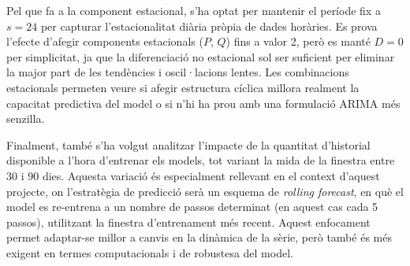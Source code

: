 \documentclass[../main.tex]{subfiles}
\begin{document}
Pel que fa a la component estacional, s’ha optat per mantenir el període fix a $s = 24$ per capturar l’estacionalitat diària pròpia de dades horàries. Es prova l’efecte d’afegir components estacionals ($P$, $Q$) fins a valor 2, però es manté $D = 0$ per simplicitat, ja que la diferenciació no estacional sol ser suficient per eliminar la major part de les tendències i oscil·lacions lentes. Les combinacions estacionals permeten veure si afegir estructura cíclica millora realment la capacitat predictiva del model o si n’hi ha prou amb una formulació ARIMA més senzilla.

Finalment, també s’ha volgut analitzar l’impacte de la quantitat d’historial disponible a l’hora d’entrenar els models, tot variant la mida de la finestra entre 30 i 90 dies. Aquesta variació és especialment rellevant en el context d’aquest projecte, on l'estratègia de predicció serà un esquema de \textit{rolling forecast}, en què el model es re-entrena a un nombre de passos determinat (en aquest cas cada 5 passos), utilitzant la finestra d’entrenament més recent. Aquest enfocament permet adaptar-se millor a canvis en la dinàmica de la sèrie, però també és més exigent en termes computacionals i de robustesa del model.
\end{document}
